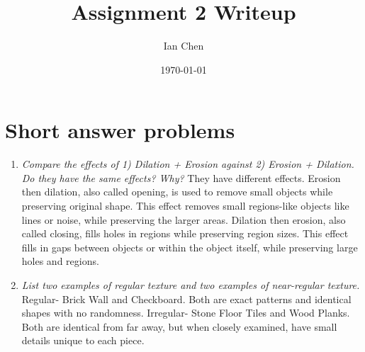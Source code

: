 \documentclass[11pt]{article}
\title{Assignment 2 Writeup}
\author{Ian Chen}
\date{\today}
\begin{document}
    \maketitle

    \section{Short answer problems}
    
    \begin{enumerate}
    \item \textit{Compare the effects of 1) Dilation + Erosion against 2) Erosion + Dilation. Do they have the same
    effects? Why?}\newline
    They have different effects. Erosion then dilation, also called opening, is used to
    remove small objects while preserving original shape. This effect removes small regions-like objects like lines
    or noise, while preserving the larger areas. Dilation then erosion, also called closing, fills holes in regions
    while preserving region sizes. This effect fills in gaps between objects or within the object itself, while
    preserving large holes and regions.\newline

    \item \textit{List two examples of regular texture and two examples of near-regular texture.}\newline
    Regular- Brick Wall and Checkboard. Both are exact patterns and identical shapes with no randomness.\newline
    Irregular- Stone Floor Tiles and Wood Planks. Both are identical from far away, but when closely examined, have
    small details unique to each piece.\newline


\end{enumerate}
\end{document}
